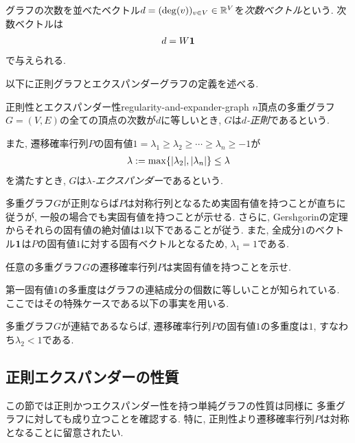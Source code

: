 グラフの次数を並べたベクトル$d=(\deg(v))_{v\in V}\in \mathbb{R}^V$を\emph{次数ベクトル}という.
次数ベクトルは
\begin{align*}
  d = W\mathbf{1}
\end{align*}
で与えられる.


以下に正則グラフとエクスパンダーグラフの定義を述べる.

\begin{definition}{正則性とエクスパンダー性}{regularity-and-expander-graph}
  $n$頂点の多重グラフ$G=(V,E)$の全ての頂点の次数が$d$に等しいとき, $G$は\emph{$d$-正則}であるという.

  また, 遷移確率行列$P$の固有値$1=\lambda_1\ge \lambda_2\ge \cdots \ge \lambda_n \ge -1$が
  \begin{align*}
    \lambda:=\max\{\abs{\lambda_2}, \abs{\lambda_n}\} \le \lambda
  \end{align*}
  を満たすとき, $G$は\emph{$\lambda$-エクスパンダー}であるという.
\end{definition}

多重グラフ$G$が正則ならば$P$は対称行列となるため実固有値を持つことが直ちに従うが, 一般の場合でも実固有値を持つことが示せる.
さらに, Gershgorinの定理からそれらの固有値の絶対値は$1$以下であることが従う.
また, 全成分$1$のベクトル$\mathbf{1}$は$P$の固有値$1$に対する固有ベクトルとなるため, $\lambda_1=1$である.

\begin{exercise}{}
  任意の多重グラフ$G$の遷移確率行列$P$は実固有値を持つことを示せ.
\end{exercise}

第一固有値$1$の多重度はグラフの連結成分の個数に等しいことが知られている.
ここではその特殊ケースである以下の事実を用いる.

\begin{proposition}{}{}
  多重グラフ$G$が連結であるならば, 遷移確率行列$P$の固有値$1$の多重度は$1$, すなわち$\lambda_2<1$である.
\end{proposition}

\subsection{正則エクスパンダーの性質}

この節では正則かつエクスパンダー性を持つ単純グラフの性質は同様に
多重グラフに対しても成り立つことを確認する.
特に, 正則性より遷移確率行列$P$は対称となることに留意されたい.

